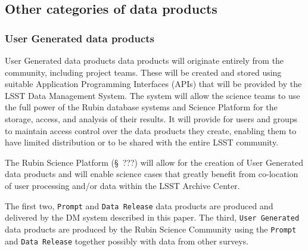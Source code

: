  


\subsection{Other categories of data products}
\label{sec:dpother}

\subsubsection{User Generated data products} \label{sec:dp-user}
User Generated data products data products will originate entirely from the community, including project teams.
These will be created and stored using suitable Application Programming Interfaces (APIs)
that will be provided by the LSST Data Management System.
The system will allow the science teams to use the full power of the Rubin database systems and
Science Platform for the storage, access, and analysis of their results.
It will provide for users and groups to maintain access control over the data products they create,
enabling them to have limited distribution or to be shared with the entire LSST community.

The Rubin Science Platform (\S~???) will allow for the creation of User Generated data
products and will enable science cases that greatly benefit from co-location of
user processing and/or data within the LSST Archive Center.

%



The first two, {\tt Prompt} and {\tt Data Release} data products are produced and delivered by the DM system described in this paper.
The third, {\tt User Generated} data products are produced by the Rubin Science Community using the {\tt Prompt} and {\tt Data Release} together possibly with data from other surveys.

